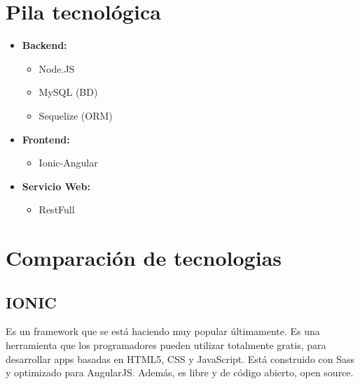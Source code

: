 \documentclass{article}
\begin{document}
\section{Pila tecnológica}
\begin{itemize}
\item \textbf{Backend:}
\begin{itemize}
\item Node.JS
\item MySQL (BD)
\item Sequelize (ORM)
\end{itemize}
\item \textbf{Frontend:}
    \begin{itemize}
    \item Ionic-Angular
    \end{itemize}
    \item \textbf{Servicio Web:}
    \begin{itemize}
    \item RestFull
    \end{itemize}
\end{itemize}
\section{Comparación de tecnologias}
\subsection{IONIC}
\quad Es un framework que se está haciendo muy popular últimamente. 
Es una herramienta que los programadores pueden utilizar totalmente gratis, 
para desarrollar apps basadas en HTML5, CSS y JavaScript. Está construido con
 Sass y optimizado para AngularJS. Además, es libre y de código abierto, open source.
\end{document}
